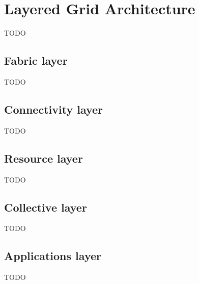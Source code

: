 \section{Layered Grid Architecture}
TODO

\subsection{Fabric layer}
TODO

\subsection{Connectivity layer}
TODO

\subsection{Resource layer}
TODO

\subsection{Collective layer}
TODO

\subsection{Applications layer}
TODO
